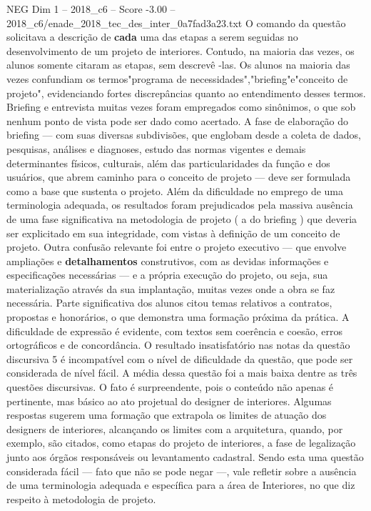 \begin{textsample}{NEG Dim 1 – 2018\_c6 – Score -3.00 – 2018\_c6/enade\_2018\_tec\_des\_inter\_0a7fad3a23.txt}
O comando da questão solicitava a descrição de \textbf{cada} uma das etapas a serem seguidas no desenvolvimento de um projeto de interiores.
Contudo, na maioria das vezes, os alunos somente citaram as etapas, sem descrevê -las.
Os alunos na maioria das vezes confundiam os termos"programa de necessidades","briefing"e"conceito de projeto", evidenciando fortes discrepâncias quanto ao entendimento desses termos.
Briefing e entrevista muitas vezes foram empregados como sinônimos, o que sob nenhum ponto de vista pode ser dado como acertado.
A fase de elaboração do briefing — com suas diversas subdivisões, que englobam desde a coleta de dados, pesquisas, análises e diagnoses, estudo das normas vigentes e demais determinantes físicos, culturais, além das particularidades da função e dos usuários, que abrem caminho para o conceito de projeto — deve ser formulada como a base que sustenta o projeto.
Além da dificuldade no emprego de uma terminologia adequada, os resultados foram prejudicados pela massiva ausência de uma fase significativa na metodologia de projeto ( a do briefing ) que deveria ser explicitado em sua integridade, com vistas à definição de um conceito de projeto.
Outra confusão relevante foi entre o projeto executivo — que envolve ampliações e \textbf{detalhamentos} construtivos, com as devidas informações e especificações necessárias — e a própria execução do projeto, ou seja, sua materialização através da sua implantação, muitas vezes onde a obra se faz necessária.
Parte significativa dos alunos citou temas relativos a contratos, propostas e honorários, o que demonstra uma formação próxima da prática.
A dificuldade de expressão é evidente, com textos sem coerência e coesão, erros ortográficos e de concordância.
O resultado insatisfatório nas notas da questão discursiva 5 é incompatível com o nível de dificuldade da questão, que pode ser considerada de nível fácil.
A média dessa questão foi a mais baixa dentre as três questões discursivas.
O fato é surpreendente, pois o conteúdo não apenas é pertinente, mas básico ao ato projetual do designer de interiores.
Algumas respostas sugerem uma formação que extrapola os limites de atuação dos designers de interiores, alcançando os limites com a arquitetura, quando, por exemplo, são citados, como etapas do projeto de interiores, a fase de legalização junto aos órgãos responsáveis ou levantamento cadastral.
Sendo esta uma questão considerada fácil — fato que não se pode negar —, vale refletir sobre a ausência de uma terminologia adequada e específica para a área de Interiores, no que diz respeito à metodologia de projeto.

\end{textsample}
